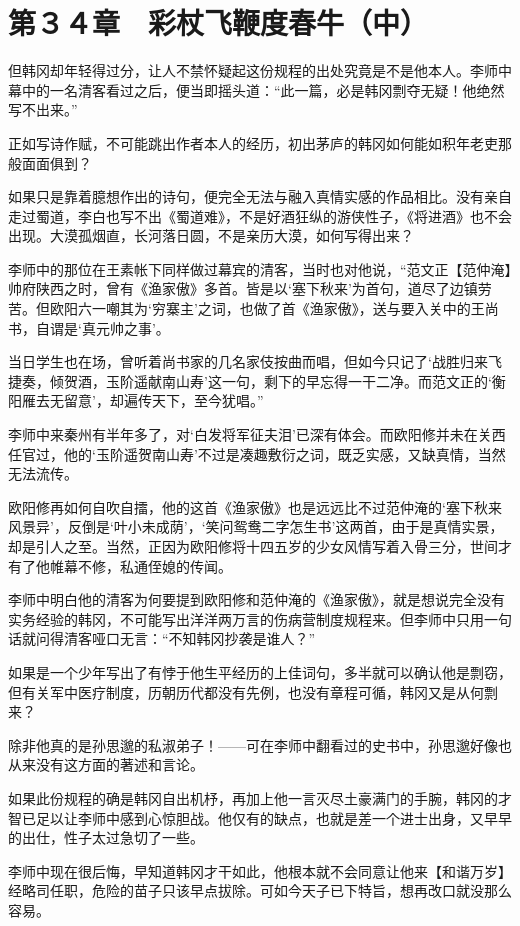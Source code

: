 \section{第３４章　彩杖飞鞭度春牛（中）}

但韩冈却年轻得过分，让人不禁怀疑起这份规程的出处究竟是不是他本人。李师中幕中的一名清客看过之后，便当即摇头道：“此一篇，必是韩冈剽夺无疑！他绝然写不出来。”

正如写诗作赋，不可能跳出作者本人的经历，初出茅庐的韩冈如何能如积年老吏那般面面俱到？

如果只是靠着臆想作出的诗句，便完全无法与融入真情实感的作品相比。没有亲自走过蜀道，李白也写不出《蜀道难》，不是好酒狂纵的游侠性子，《将进酒》也不会出现。大漠孤烟直，长河落日圆，不是亲历大漠，如何写得出来？

李师中的那位在王素帐下同样做过幕宾的清客，当时也对他说，“范文正【范仲淹】帅府陕西之时，曾有《渔家傲》多首。皆是以‘塞下秋来’为首句，道尽了边镇劳苦。但欧阳六一嘲其为‘穷寨主’之词，也做了首《渔家傲》，送与要入关中的王尚书，自谓是‘真元帅之事’。

当日学生也在场，曾听着尚书家的几名家伎按曲而唱，但如今只记了‘战胜归来飞捷奏，倾贺酒，玉阶遥献南山寿’这一句，剩下的早忘得一干二净。而范文正的‘衡阳雁去无留意’，却遍传天下，至今犹唱。”

李师中来秦州有半年多了，对‘白发将军征夫泪’已深有体会。而欧阳修并未在关西任官过，他的‘玉阶遥贺南山寿’不过是凑趣敷衍之词，既乏实感，又缺真情，当然无法流传。

欧阳修再如何自吹自擂，他的这首《渔家傲》也是远远比不过范仲淹的‘塞下秋来风景异’，反倒是‘叶小未成荫’，‘笑问鸳鸯二字怎生书’这两首，由于是真情实景，却是引人之至。当然，正因为欧阳修将十四五岁的少女风情写着入骨三分，世间才有了他帷幕不修，私通侄媳的传闻。

李师中明白他的清客为何要提到欧阳修和范仲淹的《渔家傲》，就是想说完全没有实务经验的韩冈，不可能写出洋洋两万言的伤病营制度规程来。但李师中只用一句话就问得清客哑口无言：“不知韩冈抄袭是谁人？”

如果是一个少年写出了有悖于他生平经历的上佳词句，多半就可以确认他是剽窃，但有关军中医疗制度，历朝历代都没有先例，也没有章程可循，韩冈又是从何剽来？

除非他真的是孙思邈的私淑弟子！——可在李师中翻看过的史书中，孙思邈好像也从来没有这方面的著述和言论。

如果此份规程的确是韩冈自出机杼，再加上他一言灭尽土豪满门的手腕，韩冈的才智已足以让李师中感到心惊胆战。他仅有的缺点，也就是差一个进士出身，又早早的出仕，性子太过急切了一些。

李师中现在很后悔，早知道韩冈才干如此，他根本就不会同意让他来【和谐万岁】经略司任职，危险的苗子只该早点拔除。可如今天子已下特旨，想再改口就没那么容易。

